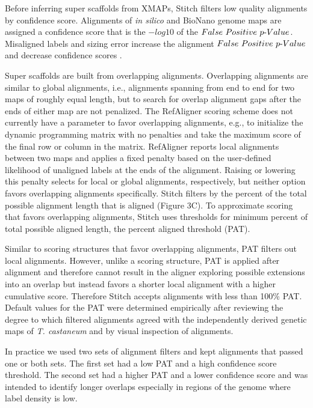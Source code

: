 \documentclass{bmcart}
\begin{document}
Before inferring super scaffolds from XMAPs, Stitch filters low quality alignments by confidence score. Alignments of \textit{in silico} and BioNano genome maps are assigned a confidence score that is the $-log10$ of the $False\textnormal{ }Positive\textnormal{ }p\textnormal{-}Value$. Misaligned labels and sizing error increase the alignment $False\textnormal{ }Positive\textnormal{ }p\textnormal{-}Value$ and decrease confidence scores \cite{ProbFP}.

Super scaffolds are built from overlapping alignments. Overlapping alignments are similar to global alignments, i.e., alignments spanning from end to end for two maps of roughly equal length, but to search for overlap alignment gaps after the ends of either map are not penalized. The RefAligner scoring scheme does not currently have a parameter to favor overlapping alignments, e.g., to initialize the dynamic programming matrix with no penalties and take the maximum score of the final row or column in the matrix. RefAligner reports local alignments between two maps and applies a fixed penalty based on the user-defined likelihood of unaligned labels at the ends of the alignment. Raising or lowering this penalty selects for local or global alignments, respectively, but neither option favors overlapping alignments specifically. Stitch filters by the percent of the total possible alignment length that is aligned (Figure 3C). To approximate scoring that favors overlapping alignments, Stitch uses thresholds for minimum percent of total possible aligned length, the percent aligned threshold (PAT). 

Similar to scoring structures that favor overlapping alignments, PAT filters out local alignments. However, unlike a scoring structure, PAT is applied after alignment and therefore cannot result in the aligner exploring possible extensions into an overlap but instead favors a shorter local alignment with a higher cumulative score. Therefore Stitch accepts alignments with less than 100\% PAT. Default values for the PAT were determined empirically after reviewing the degree to which filtered alignments agreed with the independently derived genetic maps of \textit{T. castaneum} and by visual inspection of alignments.

In practice we used two sets of alignment filters and kept alignments that passed one or both sets. The first set had a low PAT and a high confidence score threshold. The second set had a higher PAT and a lower confidence score and was intended to identify longer overlaps especially in regions of the genome where label density is low.
\end{document}
